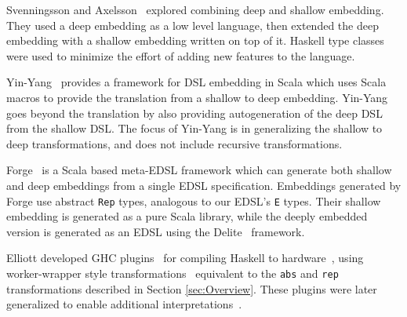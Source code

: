 \documentclass[sigplan,anonymous,review]{acmart}
\begin{document}
Svenningsson and Axelsson~\cite{Svenningsson:13:Combining}
explored combining deep and shallow embedding.  They used
a deep embedding as a low level language, then extended
the deep embedding with a shallow embedding written on top
of it. Haskell type classes were used to minimize the effort of adding
new features to the language.

Yin-Yang~\cite{Jovanovic:2014} provides a framework for DSL
embedding in Scala which uses Scala macros to provide the 
translation from a shallow to deep embedding.  Yin-Yang
goes beyond the translation by also providing autogeneration
of the deep DSL from the shallow DSL.  The focus of
Yin-Yang is in generalizing the shallow to deep transformations,
and does not include recursive transformations.

Forge~\cite{Sujeeth:2013} is a Scala based meta-EDSL framework
which can generate both shallow and deep embeddings from
a single EDSL specification.  Embeddings generated by Forge
use abstract \verb|Rep| types, analogous to our EDSL's 
\verb|E| types.  Their shallow embedding is generated
as a pure Scala library, while the deeply embedded version
is generated as an EDSL using the Delite~\cite{Sujeeth:2014}
framework.

Elliott developed GHC plugins~\cite{github:lambda-ccc}\cite{github:reification-rules}
for compiling Haskell to hardware~\cite{github:Elliott:Talk:2015},
using worker-wrapper style transformations~\cite{Gill:09:WW}
equivalent to the \verb|abs| and
\verb|rep| transformations described in Section \ref{sec:Overview}. These plugins were later generalized to enable additional interpretations~\cite{Elliott:2017}.





\appendix
\end{document}
